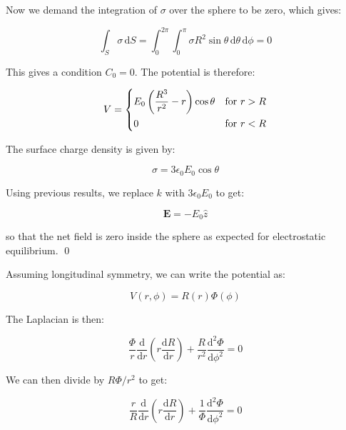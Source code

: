 \documentclass[12pt]{article}
\begin{document}
Now we demand the integration of $\sigma$ over the sphere to be zero, which gives:

\begin{equation}
    \int_{S} \sigma \, \mathrm{d}S = \int_{0}^{2\pi} \int_{0}^{\pi} \sigma R^{2} \sin{\theta} \, \mathrm{d}\theta \, \mathrm{d}\phi = 0
\end{equation}

This gives a condition $C_{0} = 0$. The potential is therefore:

\begin{equation}
V =
\begin{dcases}
    E_{0} \left( \frac{R^{3}}{r^{2}} - r \right) \cos{\theta} & \text{for } r > R \\
    0 & \text{for } r < R
\end{dcases}
\end{equation}

The surface charge density is given by:

\begin{equation}
    \sigma = 3\epsilon_{0} E_{0} \cos{\theta}
\end{equation}

Using previous results, we replace $k$ with $3\epsilon_{0} E_{0}$ to get:

\begin{equation}
    \mathbf{E} = -E_{0} \hat{z}
\end{equation}

so that the net field is zero inside the sphere as expected for electrostatic equilibrium.
\qed



Assuming longitudinal symmetry, we can write the potential as:

\begin{equation}
    V(r, \phi) = R(r) \Phi(\phi) 
\end{equation}

The Laplacian is then:

\begin{equation}
    \frac{\Phi}{r} \frac{\mathrm{d}}{\mathrm{d}r} \left( r \frac{\mathrm{d}R}{\mathrm{d}r} \right) + \frac{R}{r^{2}} \frac{\mathrm{d}^{2}\Phi}{\mathrm{d}\phi^{2}} = 0
\end{equation}

We can then divide by $R\Phi/r^{2}$ to get:

\begin{equation}
    \frac{r}{R} \frac{\mathrm{d}}{\mathrm{d}r} \left( r \frac{\mathrm{d}R}{\mathrm{d}r} \right) + \frac{1}{\Phi} \frac{\mathrm{d}^{2}\Phi}{\mathrm{d}\phi^{2}} = 0
\end{equation}
\end{document}
